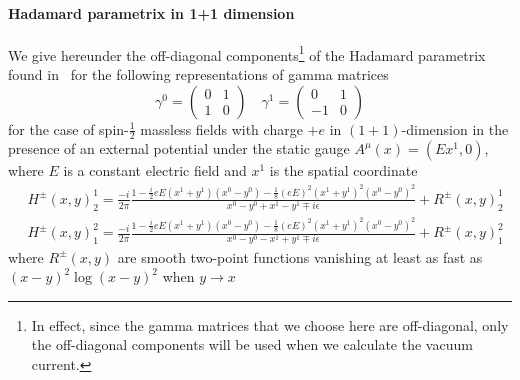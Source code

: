 \paragraph{Hadamard parametrix in 1+1 dimension}
We give hereunder the off-diagonal components\footnote{
In effect, since the gamma matrices that we choose here are off-diagonal, only the off-diagonal components will be used when we calculate the vacuum current.
}
 of the Hadamard parametrix found in~\cite{Zahn2015} for the following representations of gamma matrices
\begin{equation*}
\gamma^0 = \begin{pmatrix}
0 & 1 \\
1 & 0 \end{pmatrix}  \quad  \gamma^1 = \begin{pmatrix}
0  & 1 \\
-1 & 0
\end{pmatrix}
\end{equation*}
for the case of spin-$\frac 1 2$ massless fields with charge $+e$ in $(1+1)$-dimension in the presence of an external potential under the static gauge $A^\mu(x) = (Ex^1, 0)$, where $E$ is a constant electric field and $x^1$ is the spatial coordinate
\begin{equation}\label{vacuum-hadamardparametrix}
\begin{split}
& H^\pm (x, y)^1_2 = \frac{-i}{2\pi}\frac{1-\frac i 2 e E(x^1 + y^1)(x^0-y^0) 
- \frac 1 8 (eE)^2(x^1 + y^1)^2(x^0 - y^0)^2}{x^0 - y^0 + x^1 - y^1 \mp i \epsilon}  + R^\pm(x,y)^{1}_2\\
& H^\pm (x, y)^2_1 = \frac{-i}{2\pi}\frac{1-\frac i 2 e E(x^1 + y^1)(x^0-y^0) 
- \frac 1 8 (eE)^2(x^1 + y^1)^2(x^0 - y^0)^2}{x^0 - y^0 - x^1 + y^1 \mp i \epsilon} + R^\pm(x,y)^{2}_1
\end{split}
\end{equation}
where $R^\pm(x,y)$ are smooth two-point functions vanishing at least as fast as $(x-y)^2 \log(x-y)^2$  when $y\rightarrow x$
















